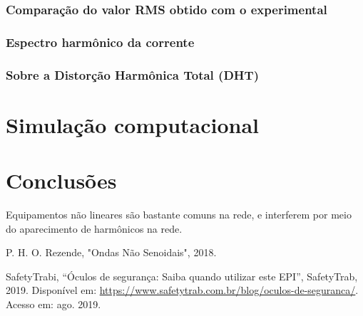 \documentclass[a4paper,12pt,oneside,openany,table,xcdraw]{article}
\begin{document}
\subsubsection{Comparação do valor RMS obtido com o experimental}

\subsubsection{Espectro harmônico da corrente}

\subsubsection{Sobre a Distorção Harmônica Total (DHT)}



\vspace{1cm}
\section{Simulação computacional} %

\vspace{2cm}
\section{Conclusões} %
Equipamentos não lineares são bastante comuns na rede, e interferem por meio do aparecimento de harmônicos na rede.

\newpage
\begin{thebibliography}{9} 
    P. H. O. Rezende,
    "Ondas Não Senoidais", 2018.

    SafetyTrabi,
    “Óculos de segurança: Saiba quando utilizar este EPI”, SafetyTrab, 2019.
 Disponível em:
 \url{https://www.safetytrab.com.br/blog/oculos-de-seguranca/}. Acesso em: ago. 2019.

\end{thebibliography}
\end{document}
